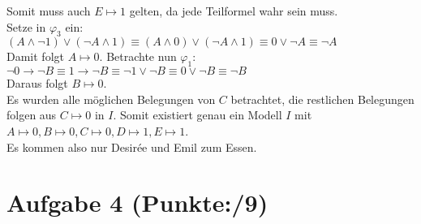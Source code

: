 \documentclass[11pt, a4paper]{article}
\newcommand{\pp}{9}
\begin{document}
\begin{adjustwidth}{20pt}{20pt}
Somit muss auch $E\mapsto 1$ gelten, da jede Teilformel wahr sein muss.\\
Setze in $\varphi_3$ ein:\\

$(A\wedge\neg 1)\vee(\neg A \wedge 1)\equiv (A\wedge 0)\vee(\neg A \wedge 1) \equiv 0 \vee \neg A \equiv \neg A$\\

Damit folgt $A\mapsto 0$. Betrachte nun $\varphi_1$:\\

$\neg 0 \rightarrow  \neg B \equiv 1 \rightarrow  \neg B \equiv \neg 1 \vee \neg B \equiv 0 \vee \neg B  \equiv \neg B$\\

Daraus folgt $B\mapsto 0$.\\

Es wurden alle möglichen Belegungen von $C$ betrachtet, die restlichen Belegungen folgen aus $C\mapsto 0$ in $I$. Somit existiert genau ein Modell $I$ mit $A\mapsto 0, B \mapsto 0, C \mapsto 0, D \mapsto 1, E\mapsto 1$.\\

Es kommen also nur Desir\'{e}e und Emil zum Essen.


\end{adjustwidth}




\section*{Aufgabe 4 (Punkte:\qquad/\pp)}
\end{document}
